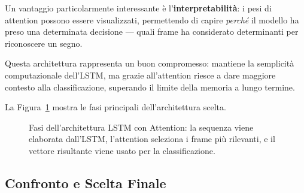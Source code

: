 Un vantaggio particolarmente interessante è l'\textbf{interpretabilità}: i pesi di attention possono essere visualizzati, permettendo di capire \textit{perché} il modello ha preso una determinata decisione --- quali frame ha considerato determinanti per riconoscere un segno.

Questa architettura rappresenta un buon compromesso: mantiene la semplicità computazionale dell'LSTM, ma grazie all'attention riesce a dare maggiore contesto alla classificazione, superando il limite della memoria a lungo termine.

La Figura~\ref{fig:lstm_attention} mostra le fasi principali dell'architettura scelta.

\begin{figure}[H]
    \centering
    \caption{Fasi dell'architettura LSTM con Attention: la sequenza viene elaborata dall'LSTM, l'attention seleziona i frame più rilevanti, e il vettore risultante viene usato per la classificazione.}
    \label{fig:lstm_attention}
\end{figure}

\subsection{Confronto e Scelta Finale}

